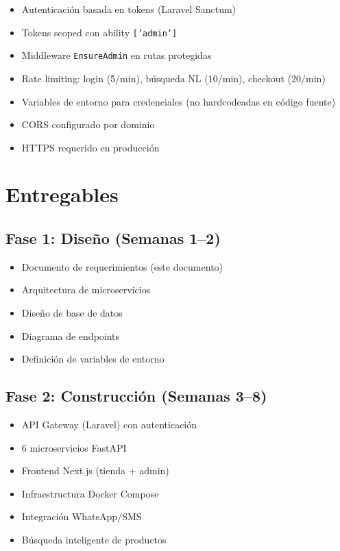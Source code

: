 \documentclass[11pt,a4paper]{article}
\begin{document}
\begin{itemize}
    \item Autenticación basada en tokens (Laravel Sanctum)
    \item Tokens scoped con ability \texttt{['admin']}
    \item Middleware \texttt{EnsureAdmin} en rutas protegidas
    \item Rate limiting: login (5/min), búsqueda NL (10/min), checkout (20/min)
    \item Variables de entorno para credenciales (no hardcodeadas en código fuente)
    \item CORS configurado por dominio
    \item HTTPS requerido en producción
\end{itemize}

\section{Entregables}

\subsection{Fase 1: Diseño (Semanas 1--2)}
\begin{itemize}
    \item Documento de requerimientos (este documento)
    \item Arquitectura de microservicios
    \item Diseño de base de datos
    \item Diagrama de endpoints
    \item Definición de variables de entorno
\end{itemize}

\subsection{Fase 2: Construcción (Semanas 3--8)}
\begin{itemize}
    \item API Gateway (Laravel) con autenticación
    \item 6 microservicios FastAPI
    \item Frontend Next.js (tienda + admin)
    \item Infraestructura Docker Compose
    \item Integración WhatsApp/SMS
    \item Búsqueda inteligente de productos
\end{itemize}
\end{document}
